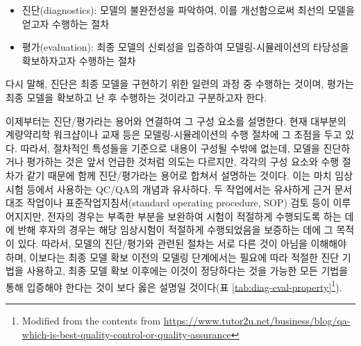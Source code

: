 \documentclass[
  10pt,
  krantz2,
  a4paper]{krantz}
\providecommand{\tightlist}{%
  \setlength{\itemsep}{0pt}\setlength{\parskip}{0pt}}
\theoremstyle{definition}
\theoremstyle{definition}
\theoremstyle{definition}
\theoremstyle{remark}
\begin{document}
\begin{itemize}
\tightlist
\item
  진단(diagnostics): 모델의 불완전성을 파악하여, 이를 개선함으로써 최선의 모델을 얻고자 수행하는 절차
\item
  평가(evaluation): 최종 모델의 신뢰성을 입증하여 모델링-시뮬레이션의 타당성을 확보하자고자 수행하는 절차
\end{itemize}

다시 말해, 진단은 최종 모델을 구현하기 위한 일련의 과정 중 수행하는 것이며, 평가는 최종 모델을 확보하고 난 후 수행하는 것이라고 구분하고자 한다.

이제부터는 진단/평가라는 용어와 연결하여 그 구성 요소를 설명한다. 현재 대부분의 계량약리학 워크샵이나 교재 등은 모델링-시뮬레이션의 수행 절차에 그 초점을 두고 있다. 따라서, 절차적인 특성들을 기준으로 내용이 구성될 수밖에 없는데, 모델을 진단하거나 평가하는 것은 앞서 언급한 것처럼 의도는 다르지만, 각각의 구성 요소와 수행 절차가 같기 때문에 함께 진단/평가라는 용어로 합쳐서 설명하는 것이다. 이는 마치 임상시험 등에서 사용하는 QC/QA의 개념과 유사하다. 두 작업에서는 유사하게 근거 문서 대조 작업이나 표준작업지침서(standard operating procedure, SOP) 검토 등이 이루어지지만, 전자의 경우는 부족한 부분을 보완하여 시험이 적절하게 수행되도록 하는 데에 반해 후자의 경우는 해당 임상시험이 적절하게 수행되었음을 보증하는 데에 그 목적이 있다. 따라서, 모델의 진단/평가와 관련된 절차는 서로 다른 것이 아님을 이해해야 하며, 이보다는 최종 모델 확보 이전의 모델링 단계에서는 필요에 따라 적절한 진단 기법을 사용하고, 최종 모델 확보 이후에는 이것이 정당하다는 것을 가능한 모든 기법을 통해 입증해야 한다는 것이 보다 옳은 설명일 것이다(표 \ref{tab:diag-eval-property}\footnote{Modified from the contents from \url{https://www.tutor2u.net/business/blog/qa-which-is-best-quality-control-or-quality-assurance}}).

\end{document}
